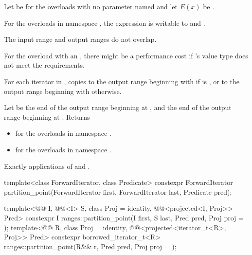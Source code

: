 \begin{itemdescr}
\pnum
Let  be 
for the overloads with no parameter named  and
let $E(x)$ be .

\pnum
\mandates
For the overloads in namespace ,
the expression 
is writable
to  and .

\pnum
\expects
The input range and output ranges do not overlap.

\begin{note}
For the overload with an ,
there might be a performance cost if 's value type
does not meet the  requirements.
\end{note}

\pnum
\effects
For each iterator  in ,
copies  to the output range beginning with 
if  is , or
to the output range beginning with  otherwise.

\pnum
\returns
Let  be the end of the output range beginning at ,
and  the end of the output range beginning at .
Returns
\begin{itemize}
\item {} for the overloads in namespace .
\item {} for the overloads in namespace .
\end{itemize}

\pnum
\complexity
Exactly  applications of  and .
\end{itemdescr}

%
\begin{itemdecl}
template<class ForwardIterator, class Predicate>
  constexpr ForwardIterator
    partition_point(ForwardIterator first, ForwardIterator last, Predicate pred);

template<@@ I, @@<I> S, class Proj = identity,
         @@<projected<I, Proj>> Pred>
  constexpr I ranges::partition_point(I first, S last, Pred pred, Proj proj = {});
template<@@ R, class Proj = identity,
         @@<projected<iterator_t<R>, Proj>> Pred>
  constexpr borrowed_iterator_t<R>
    ranges::partition_point(R&& r, Pred pred, Proj proj = {});
\end{itemdecl}

